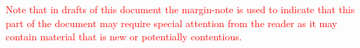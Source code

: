 \textcolor{red}{Note that in drafts of this document the margin-note is used to indicate that this
part of the document may require special attention from the reader as it may contain
material that is new or potentially contentious.}


